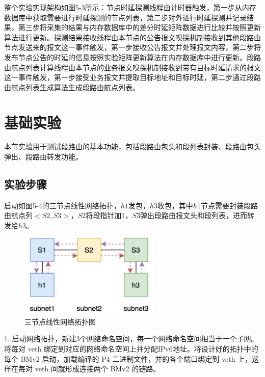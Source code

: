 整个实验实现架构如图5-3所示：节点时延探测线程由计时器触发，第一步从内存数据库中获取需要进行时延探测的节点列表，第二步对外进行时延探测并记录结果，第三步将采集的结果与内存数据库中的差分时延矩阵数据进行比较并按照更新算法进行更新。探测结果接收线程由本节点的公告报文嗅探机制接收到其他段路由节点发送来的报文这一事件触发，第一步接收公告报文并处理报文内容，第二步将发布节点公告的时延的信息按照实验矩阵更新算法在内存数据库中进行更新。段路由航点列表计算线程由本节点的业务报文嗅探机制接收到带有目标时延请求的报文这一事件触发，第一步接受业务报文并提取目标地址和目标时延，第二步通过段路由航点列表生成算法生成段路由航点列表。

\section{基础实验}

本节实验用于测试段路由的基本功能，包括段路由包头和段列表封装、段路由包头弹出、段路由转发功能。

\subsection{实验步骤}

启动如图5-4的三节点线性网络拓扑，$h1$发包，$h3$收包，其中$h1$节点需要封装段路由航点列$<S2, S3>$，$S2$将段指针加1，$S3$弹出段路由报文头和段列表，进而转发给$h3$。

\begin{figure}[htbp]
\setlength{\abovecaptionskip}{15pt plus 3pt minus 2pt}
\centerline{\includegraphics[width=0.6\textwidth]{./figures/ch5-three-line-topo.png}}
\caption{三节点线性网络拓扑图}
\label{fig-ch5-three-line-topo}
\end{figure}

1. 启动网络拓扑，新建3个网络命名空间，每一个网络命名空间相当于一个子网。将每对 \gls*{veth} 绑定到对应的网络命名空间上并分配IPv6地址。将设计好的拓扑中的每个 \gls*{BMv2} 启动，加载编译的 \gls*{P4} 二进制文件，并的各个端口绑定到 \gls*{veth} 上，这样在每对 \gls*{veth} 间就形成连接两个 \gls*{BMv2} 的链路。

